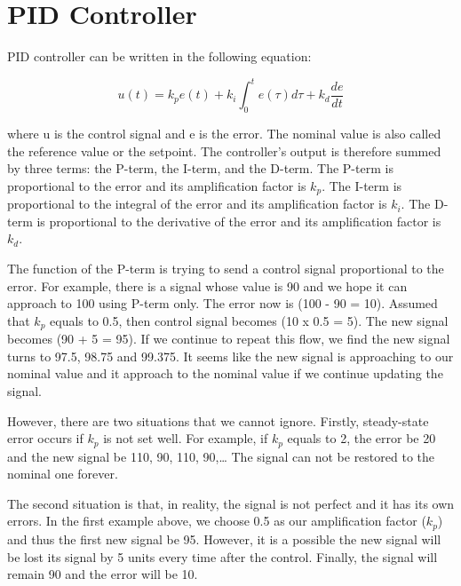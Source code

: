 \section{PID Controller} %
PID controller can be written in the following equation:

\begin{equation} \label{eq3}
u(t) = k_p e(t) + k_i \int_{0}^{t} e(\tau) d\tau + k_d \frac{d e}{d t}
\end{equation}

 where u is the control signal and e is the error. The nominal value is also called the reference value or the setpoint. The controller’s output is therefore summed by three terms: the P-term, the I-term, and the D-term. The P-term is proportional to the error and its amplification factor is $k_p$. The I-term is proportional to the integral of the error and its amplification factor is $k_i$. The D-term is proportional to the derivative of the error and its amplification factor is $k_d$. 
 
 The function of the P-term is trying to send a control signal proportional to the error. For example, there is a signal whose value is 90 and we hope it can approach to 100 using P-term only. The error now is (100 - 90 = 10). Assumed that $k_p$ equals to 0.5, then control signal becomes (10 x 0.5 = 5). The new signal becomes (90 + 5 = 95). If we continue to repeat this flow, we find the new signal turns to 97.5, 98.75 and 99.375. It seems like the new signal is approaching to our nominal value and it approach to the nominal value if we continue updating the signal. 
 

However, there are two situations that we cannot ignore. Firstly, steady-state error occurs if $k_p$ is not set well. For example, if $k_p$ equals to 2, the error be 20 and the new signal be 110, 90, 110, 90,… The signal can not be restored to the nominal one forever.  

The second situation is that, in reality, the signal is not perfect and it has its own errors. In the first example above, we choose 0.5 as our amplification factor ($k_p$) and thus the first new signal be 95. However, it is a possible the new signal will be lost its signal by 5 units every time after the control. Finally, the signal will remain 90 and the error will be 10.  

